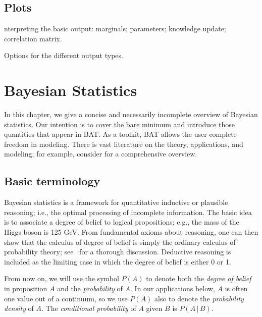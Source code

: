 \documentclass[
10pt,
a4paper,
bibliography=totoc,
captions=nooneline, %
numbers=noenddot,
twoside]{scrbook}
\newcommand{\BAT}{{\scshape BAT}\xspace}
\newcommand{\dan}[1]{{\todo[color=red]{Dan: #1}}}
\newcommand{\cond}{\,|\,}
\begin{document}
\section{Plots}
\dan

Interpreting the basic output: marginals; parameters; knowledge update; correlation matrix.

Options for the different output types.

\chapter{Bayesian Statistics} \label{sec:Bayes}

In this chapter, we give a concise and necessarily incomplete overview
of Bayesian statistics. Our intention is to cover the bare minimum and
introduce those quantities that appear in \BAT. As a toolkit, \BAT
allows the user complete freedom in modeling. There is vast literature
on the theory, applications, and modeling; for example, consider
\cite{jaynes_probability_2003, hartigan_bayes_1983, sivia_data_2006,
  mackay_information_2003, dagostini_bayesian_2003,
  kendall_kendalls_2004, gelman2014bayesian} for a comprehensive
overview.

\section{Basic terminology} \label{sec:basic-terminology}

Bayesian statistics is a framework for quantitative inductive or
plausible reasoning; i.e., the optimal processing of incomplete
information. The basic idea is to associate a degree of belief to
logical propositions; e.g., the mass of the Higgs boson is 125
GeV. From fundamental axioms about reasoning, one can then show that
the calculus of degree of belief is simply the ordinary calculus of
probability theory; see~\cite{jaynes_probability_2003} for a thorough
discussion. Deductive reasoning is included as the limiting case in
which the degree of belief is either 0 or 1.

From now on, we will use the symbol $P(A)$ to denote both the \emph{degree
of belief} in proposition $A$ and the \emph{probability} of $A$. In our
applications below, $A$ is often one value out of a continuum, so we
use $P(A)$ also to denote the \emph{probability density} of $A$.  The
\emph{conditional probability} of $A$ given $B$ is $P(A \cond B)$.
\end{document}
